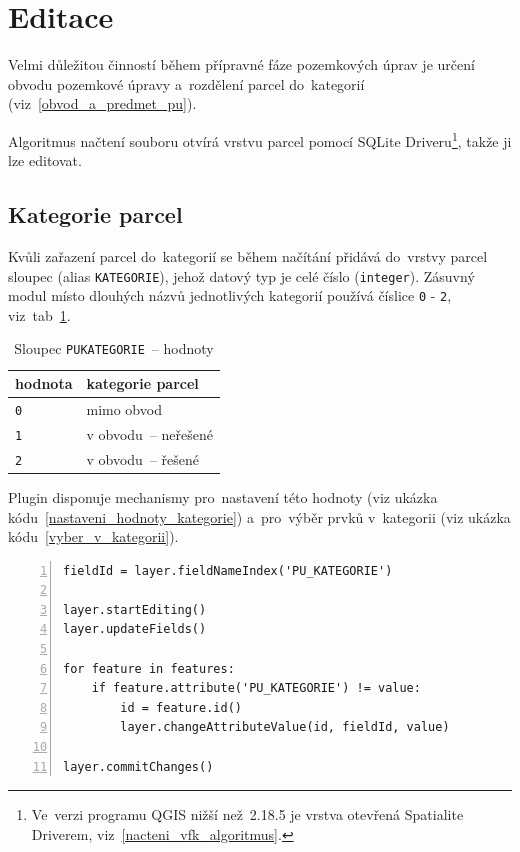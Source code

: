 \newpage

\section{Editace}
\label{editace}

Velmi důležitou činností během přípravné fáze pozemkových úprav je určení obvodu pozemkové úpravy a~rozdělení parcel do~kategorií (viz~\ref{obvod_a_predmet_pu}).

Algoritmus načtení  souboru otvírá vrstvu parcel pomocí SQLite Driveru\footnote{Ve~verzi programu QGIS nižší než~2.18.5 je vrstva otevřená Spatialite Driverem, viz~\ref{nacteni_vfk_algoritmus}.}, takže ji lze editovat.

\subsection{Kategorie parcel}
\label{kategorie_parcel}

Kvůli zařazení parcel do~kategorií se během načítání přidává do~vrstvy parcel sloupec \texttt{} (alias \texttt{KATEGORIE}), jehož datový typ je celé číslo (\texttt{integer}). Zásuvný modul místo dlouhých názvů jednotlivých kategorií používá číslice \texttt{0} - \texttt{2}, viz~tab~\ref{tab:kategorie_hodnoty}. 

\begin{table}[H]
    \begin{tabular}{|l|l|}
        \hline
         hodnota & kategorie parcel \\
        \hline
        \hline
          \texttt{0} & mimo obvod \\ \hline
          \texttt{1} & v obvodu~– neřešené \\ \hline          
          \texttt{2} & v obvodu~– řešené \\
         \hline
    \end{tabular}
    \centering
    \caption[Sloupec \texttt{PU\textunderscore KATEGORIE}~– hodnoty]{Sloupec \texttt{PU\textunderscore KATEGORIE}~– hodnoty}
    \label{tab:kategorie_hodnoty}
\end{table}

Plugin disponuje mechanismy pro~nastavení této hodnoty (viz ukázka kódu~\ref{nastaveni_hodnoty_kategorie}) a~pro~výběr prvků v~kategorii (viz ukázka kódu~\ref{vyber_v_kategorii}).

{\scriptsize
\begin{lstlisting}[style=python, caption={Kategorie parcel~– nastavení hodnoty}, captionpos=b, label=nastaveni_hodnoty_kategorie, backgroundcolor = \color{light-gray},  numbers=left]
fieldId = layer.fieldNameIndex('PU_KATEGORIE')

layer.startEditing()
layer.updateFields()

for feature in features:
    if feature.attribute('PU_KATEGORIE') != value:
        id = feature.id()
        layer.changeAttributeValue(id, fieldId, value)

layer.commitChanges()
\end{lstlisting}}

